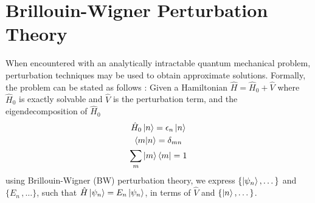 %

\chapter{Brillouin-Wigner Perturbation Theory} \label{ch:bw}
When encountered with an analytically intractable quantum mechanical problem, perturbation techniques 
may be used to obtain approximate solutions. Formally, the problem can be stated as follows : 
Given a Hamiltonian $\hat{H} = \hat{H}_{0} + \hat{V}$ where $\hat{H}_{0}$ is exactly solvable and 
$\hat{V}$ is the perturbation term, and the eigendecomposition of $\hat{H}_{0}\quad$ \textemdash 
\begin{gather*}
  \hat{H}_{0}\ket{n} = \epsilon_{n}\ket{n} \\
  \braket{m|n} = \delta_{mn} \\
  \sum_{m} {\ket{m} \bra{m}} = \mathrm{1}
\end{gather*}
using Brillouin-Wigner (BW) perturbation theory, we express $\{\ket{\psi_n},\dots\}$ and $\{E_n\,,\dots\}$, such that $\hat{H}\ket{\psi_n} = E_n\ket{\psi_n}$, in terms of
$\hat{V}$ and $\{\ket{n},\dots\}$.


